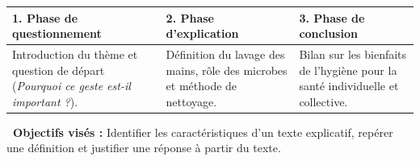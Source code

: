 \documentclass[a4paper,10pt]{article}
\begin{document}
\begin{tcolorbox}[
  enhanced,
  colback=white,
  colframe=cardborder,
  arc=2mm,boxrule=0.7pt,
  top=4pt,bottom=4pt,left=7pt,right=7pt,
  title={\small\textbf{\textcolor{primary}{\faLayerGroup\ Grille de lecture \& Hypothèses de sens}}},
  coltitle=primary,colbacktitle=primarylight,titlerule=0.5pt
]
{\footnotesize
\begin{tabularx}{\linewidth}{|X|X|X|}
\hline
\rowcolor{primarylight}\textbf{1. Phase de questionnement} & \textbf{2. Phase d'explication} & \textbf{3. Phase de conclusion} \\
\hline
Introduction du thème et question de départ (\textit{Pourquoi ce geste est-il important ?}). &
Définition du lavage des mains, rôle des microbes et méthode de nettoyage. &
Bilan sur les bienfaits de l'hygiène pour la santé individuelle et collective. \\
\hline
\end{tabularx}
}
\end{tcolorbox}

\vspace{3pt}

\begin{tcolorbox}[
  enhanced,
  colback=secondarylight!50,
  colframe=secondary,
  arc=1.5mm,leftrule=3pt,rightrule=0.5pt,toprule=0.5pt,bottomrule=0.5pt,
  top=3pt,bottom=3pt,left=6pt,right=6pt
]
{\footnotesize
\textbf{\faBullseye\ Objectifs visés :} Identifier les caractéristiques d'un texte explicatif, repérer une définition et justifier une réponse à partir du texte.
}
\end{tcolorbox}

\newpage

\ficheEleveHeader

\vspace{-3pt}

\vspace{2pt}
\end{document}
